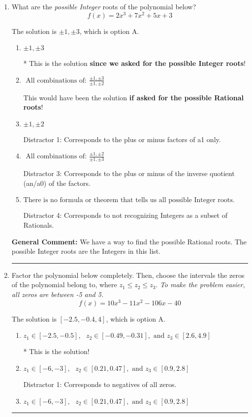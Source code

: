 \documentclass{extbook}[14pt]
\newcommand{\litem}[1]{\item #1

\rule{\textwidth}{0.4pt}}
\begin{document}
\begin{enumerate}\litem{
What are the \textit{possible Integer} roots of the polynomial below?
\[ f(x) = 2x^{3} +7 x^{2} +5 x + 3 \]

The solution is \( \pm 1,\pm 3 \), which is option A.\begin{enumerate}[label=\Alph*.]
\item \( \pm 1,\pm 3 \)

* This is the solution \textbf{since we asked for the possible Integer roots}!
\item \( \text{ All combinations of: }\frac{\pm 1,\pm 3}{\pm 1,\pm 2} \)

This would have been the solution \textbf{if asked for the possible Rational roots}!
\item \( \pm 1,\pm 2 \)

 Distractor 1: Corresponds to the plus or minus factors of a1 only.
\item \( \text{ All combinations of: }\frac{\pm 1,\pm 2}{\pm 1,\pm 3} \)

 Distractor 3: Corresponds to the plus or minus of the inverse quotient (an/a0) of the factors. 
\item \( \text{There is no formula or theorem that tells us all possible Integer roots.} \)

 Distractor 4: Corresponds to not recognizing Integers as a subset of Rationals.
\end{enumerate}

\textbf{General Comment:} We have a way to find the possible Rational roots. The possible Integer roots are the Integers in this list.
}
\litem{
Factor the polynomial below completely. Then, choose the intervals the zeros of the polynomial belong to, where $z_1 \leq z_2 \leq z_3$. \textit{To make the problem easier, all zeros are between -5 and 5.}
\[ f(x) = 10x^{3} -11 x^{2} -106 x -40 \]

The solution is \( [-2.5, -0.4, 4] \), which is option A.\begin{enumerate}[label=\Alph*.]
\item \( z_1 \in [-2.5, -0.5], \text{   }  z_2 \in [-0.49, -0.31], \text{   and   } z_3 \in [2.6, 4.9] \)

* This is the solution!
\item \( z_1 \in [-6, -3], \text{   }  z_2 \in [0.21, 0.47], \text{   and   } z_3 \in [0.9, 2.8] \)

 Distractor 1: Corresponds to negatives of all zeros.
\item \( z_1 \in [-6, -3], \text{   }  z_2 \in [0.21, 0.47], \text{   and   } z_3 \in [0.9, 2.8] \)


\end{enumerate}}
\end{enumerate}
\end{document}
